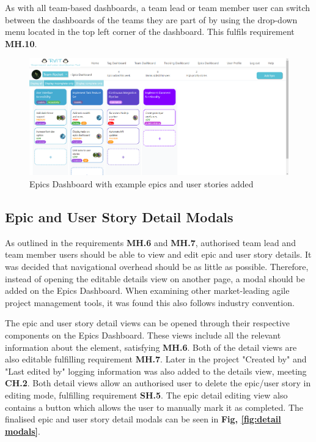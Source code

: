 \documentclass[l4proj.tex]{subfiles}
\begin{document}
As with all team-based dashboards, a team lead or team member user can switch between the dashboards of the teams they are part of by using the drop-down menu located in the top left corner of the dashboard. This fulfils requirement \textbf{MH.10}.

\begin{figure}[h!]
\begin{center}
\includegraphics[scale=0.35]{dissertation/images/EpicsDashboard.png}
\caption{Epics Dashboard with example epics and user stories added}
\label{fig:epics dashboard} 
\end{center}
\end{figure}

\subsection{Epic and User Story Detail Modals}
As outlined in the requirements \textbf{MH.6} and \textbf{MH.7}, authorised team lead and team member users should be able to view and edit epic and user story details. It was decided that navigational overhead should be as little as possible. Therefore, instead of opening the editable details view on another page, a modal should be added on the Epics Dashboard. When examining other market-leading agile project management tools, it was found this also follows industry convention. 

The epic and user story detail views can be opened through their respective components on the Epics Dashboard. These views include all the relevant information about the element, satisfying \textbf{MH.6}. Both of the detail views are also editable fulfilling requirement \textbf{MH.7}. Later in the project "Created by" and "Last edited by" logging information was also added to the details view, meeting \textbf{CH.2}. Both detail views allow an authorised user to delete the epic/user story in editing mode, fulfilling requirement \textbf{SH.5}. The epic detail editing view also contains a button which allows the user to manually mark it as completed. The finalised epic and user story detail modals can be seen in \textbf{Fig, \ref{fig:detail modals}}.
\end{document}
